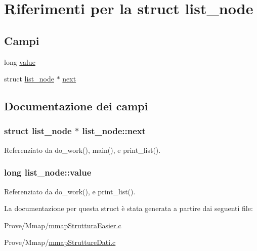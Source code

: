 \hypertarget{structlist__node}{}\section{Riferimenti per la struct list\+\_\+node}
\label{structlist__node}
\subsection*{Campi}
\begin{DoxyCompactItemize}
\item 
long \hyperlink{structlist__node_a783a68ff4a5e89d6739e38d708d13734}{value}
\item 
struct \hyperlink{structlist__node}{list\+\_\+node} $\ast$ \hyperlink{structlist__node_ad7161aa64a7b9659180387062bf096c2}{next}
\end{DoxyCompactItemize}


\subsection{Documentazione dei campi}
\hypertarget{structlist__node_ad7161aa64a7b9659180387062bf096c2}{}
\subsubsection[{next}]{\setlength{\rightskip}{0pt plus 5cm}struct {\bf list\+\_\+node} $\ast$ list\+\_\+node\+::next}\label{structlist__node_ad7161aa64a7b9659180387062bf096c2}


Referenziato da do\+\_\+work(), main(), e print\+\_\+list().

\hypertarget{structlist__node_a783a68ff4a5e89d6739e38d708d13734}{}
\subsubsection[{value}]{\setlength{\rightskip}{0pt plus 5cm}long list\+\_\+node\+::value}\label{structlist__node_a783a68ff4a5e89d6739e38d708d13734}


Referenziato da do\+\_\+work(), e print\+\_\+list().



La documentazione per questa struct è stata generata a partire dai seguenti file\+:\begin{DoxyCompactItemize}
\item 
Prove/\+Mmap/\hyperlink{mmapStrutturaEasier_8c}{mmap\+Struttura\+Easier.\+c}\item 
Prove/\+Mmap/\hyperlink{mmapStruttureDati_8c}{mmap\+Strutture\+Dati.\+c}\end{DoxyCompactItemize}
